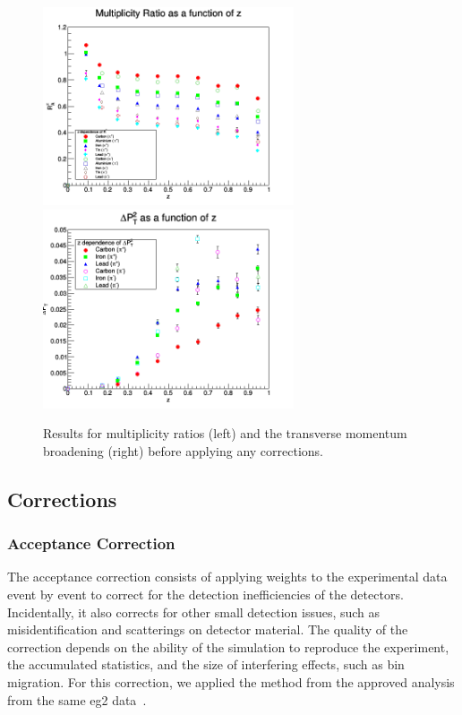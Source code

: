 \begin{figure}[p]
\includegraphics[width=7.4cm] {new-fig/42_zdep_Ratio_Zz_0.png} 
\includegraphics[width=7.4cm] {new-fig/47_zdep_DePts_Zz_0.png} 
\caption {Results for multiplicity ratios (left) and the transverse momentum 
broadening (right) before applying any corrections.}
\label{fig:prelim}
\end{figure}


\subsection{Corrections}
\label{sec:corrections}

\subsubsection{Acceptance Correction}
\label{sec:accept}

The acceptance correction consists of applying weights to the experimental data
event by event to correct for the detection inefficiencies of the detectors.
Incidentally, it also corrects for other small detection issues, such as 
misidentification and scatterings on detector material. The quality 
of the correction depends on the ability of the simulation to reproduce the 
experiment, the accumulated statistics, and the size of interfering effects, such 
as bin migration. For this correction, we applied the method from the 
approved analysis from the same eg2 data~\cite{ElFassi:2008}.

